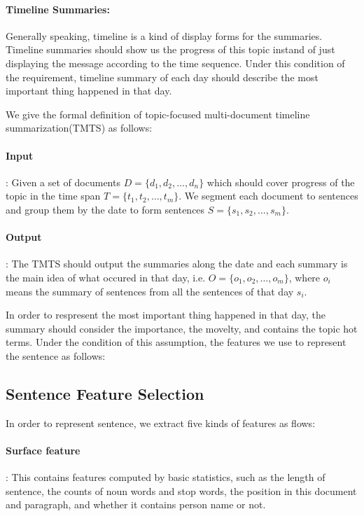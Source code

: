 \documentclass{llncs}
\begin{document}
\paragraph{Timeline Summaries:} Generally speaking, timeline is a kind of display forms for the summaries. Timeline summaries should show us the progress of this topic instand of just displaying the message according to the time sequence. Under this condition of the requirement, timeline summary of each day should describe the most important thing happened in that day.

We give the formal definition of topic-focused multi-document timeline summarization(TMTS) as follows:

\paragraph{Input}: Given a set of documents $D=\{d_1, d_2, \dots, d_n\}$ which should cover progress of the topic in the time span $T=\{t_1, t_2, \dots, t_m\}$. We segment each document to sentences and group them by the date to form sentences $S=\{s_1, s_2, \dots, s_m\}$. 

\paragraph{Output}: The TMTS should output the summaries along the date and each summary is the main idea of what occured in that day, i.e. $O=\{o_1, o_2, \dots, o_m\}$, where $o_i$ means the summary of sentences from all the sentences of that day $s_i$. 

In order to respresent the most important thing happened in that day, the summary should consider the importance, the movelty, and contains the topic hot terms. Under the condition of this assumption, the features we use to represent the sentence as follows:

\subsection{Sentence Feature Selection}

In order to represent sentence, we extract five kinds of features as flows:

\paragraph{Surface feature}: This contains features computed by basic statistics, such as the length of sentence, the counts of noun words and stop words, the position in this document and paragraph, and whether it contains person name or not. %
\end{document}
